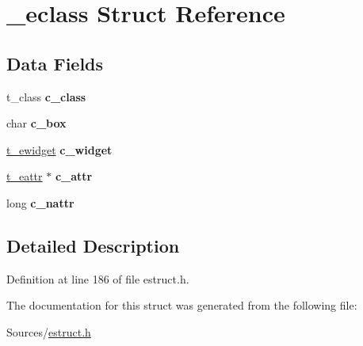 \hypertarget{struct__eclass}{\section{\-\_\-eclass Struct Reference}
\label{struct__eclass}
}
\subsection*{Data Fields}
\begin{DoxyCompactItemize}
\item 
\hypertarget{struct__eclass_a0469b08ed4568634e94e1ef9844987dc}{t\-\_\-class {\bfseries c\-\_\-class}}\label{struct__eclass_a0469b08ed4568634e94e1ef9844987dc}

\item 
\hypertarget{struct__eclass_a86d57fd0700572f515dcadd123b81748}{char {\bfseries c\-\_\-box}}\label{struct__eclass_a86d57fd0700572f515dcadd123b81748}

\item 
\hypertarget{struct__eclass_ae7433b03225f5ef8d13d025e6545952c}{\hyperlink{struct__ewidget}{t\-\_\-ewidget} {\bfseries c\-\_\-widget}}\label{struct__eclass_ae7433b03225f5ef8d13d025e6545952c}

\item 
\hypertarget{struct__eclass_a5770c150b221e33c7502b23d066675fa}{\hyperlink{struct__eattr}{t\-\_\-eattr} $\ast$ {\bfseries c\-\_\-attr}}\label{struct__eclass_a5770c150b221e33c7502b23d066675fa}

\item 
\hypertarget{struct__eclass_a2214009a25c6ee1b8b41008f15995c85}{long {\bfseries c\-\_\-nattr}}\label{struct__eclass_a2214009a25c6ee1b8b41008f15995c85}

\end{DoxyCompactItemize}


\subsection{Detailed Description}


Definition at line 186 of file estruct.\-h.



The documentation for this struct was generated from the following file\-:\begin{DoxyCompactItemize}
\item 
Sources/\hyperlink{estruct_8h}{estruct.\-h}\end{DoxyCompactItemize}
